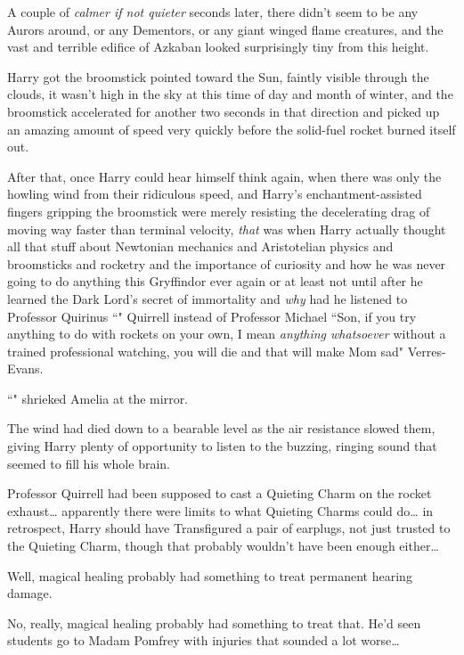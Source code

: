 A couple of \emph{calmer if not quieter} seconds later, there didn't seem to be any Aurors around, or any Dementors, or any giant winged flame creatures, and the vast and terrible edifice of Azkaban looked surprisingly tiny from this height.

Harry got the broomstick pointed toward the Sun, faintly visible through the clouds, it wasn't high in the sky at this time of day and month of winter, and the broomstick accelerated for another two seconds in that direction and picked up an amazing amount of speed very quickly before the solid-fuel rocket burned itself out.

After that, once Harry could hear himself think again, when there was only the howling wind from their ridiculous speed, and Harry's enchantment-assisted fingers gripping the broomstick were merely resisting the decelerating drag of moving way faster than terminal velocity, \emph{that} was when Harry actually thought all that stuff about Newtonian mechanics and Aristotelian physics and broomsticks and rocketry and the importance of curiosity and how he was never going to do anything this Gryffindor ever again or at least not until after he learned the Dark Lord's secret of immortality and \emph{why} had he listened to Professor Quirinus ``" Quirrell instead of Professor Michael ``Son, if you try anything to do with rockets on your own, I mean \emph{anything whatsoever} without a trained professional watching, you will die and that will make Mom sad" Verres-Evans.

\later

``" shrieked Amelia at the mirror.

\later

The wind had died down to a bearable level as the air resistance slowed them, giving Harry plenty of opportunity to listen to the buzzing, ringing sound that seemed to fill his whole brain.

Professor Quirrell had been supposed to cast a Quieting Charm on the rocket exhaust{\ldots} apparently there were limits to what Quieting Charms could do{\ldots} in retrospect, Harry should have Transfigured a pair of earplugs, not just trusted to the Quieting Charm, though that probably wouldn't have been enough either{\ldots}

Well, magical healing probably had something to treat permanent hearing damage.

No, really, magical healing probably had something to treat that. He'd seen students go to Madam Pomfrey with injuries that sounded a lot worse{\ldots}

